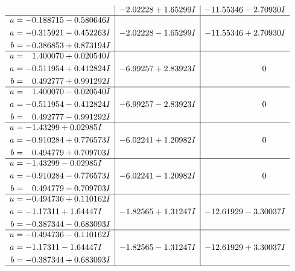 \documentclass[1p]{elsarticle_modified}
\theoremstyle{definition}
\begin{document}
$$\begin{array}{c|c|c}
 & -2.02228 + 1.65299 I & -11.55346 - 2.70930 I \\ \hline\begin{aligned}
u &= -0.188715 - 0.580646 I \\
a &= -0.315921 - 0.452263 I \\
b &= -0.386853 + 0.873194 I\end{aligned}
 & -2.02228 - 1.65299 I & -11.55346 + 2.70930 I \\ \hline\begin{aligned}
u &= \phantom{-}1.400070 + 0.020540 I \\
a &= -0.511954 + 0.412824 I \\
b &= \phantom{-}0.492777 + 0.991292 I\end{aligned}
 & -6.99257 + 2.83923 I & \phantom{-0.000000 } 0 \\ \hline\begin{aligned}
u &= \phantom{-}1.400070 - 0.020540 I \\
a &= -0.511954 - 0.412824 I \\
b &= \phantom{-}0.492777 - 0.991292 I\end{aligned}
 & -6.99257 - 2.83923 I & \phantom{-0.000000 } 0 \\ \hline\begin{aligned}
u &= -1.43299 + 0.02985 I \\
a &= -0.910284 + 0.776573 I \\
b &= \phantom{-}0.494779 + 0.709703 I\end{aligned}
 & -6.02241 + 1.20982 I & \phantom{-0.000000 } 0 \\ \hline\begin{aligned}
u &= -1.43299 - 0.02985 I \\
a &= -0.910284 - 0.776573 I \\
b &= \phantom{-}0.494779 - 0.709703 I\end{aligned}
 & -6.02241 - 1.20982 I & \phantom{-0.000000 } 0 \\ \hline\begin{aligned}
u &= -0.494736 + 0.110162 I \\
a &= -1.17311 + 1.64447 I \\
b &= -0.387344 - 0.683093 I\end{aligned}
 & -1.82565 + 1.31247 I & -12.61929 - 3.30037 I \\ \hline\begin{aligned}
u &= -0.494736 - 0.110162 I \\
a &= -1.17311 - 1.64447 I \\
b &= -0.387344 + 0.683093 I\end{aligned}
 & -1.82565 - 1.31247 I & -12.61929 + 3.30037 I\\
 \hline 
 \end{array}$$\newpage
\end{document}
